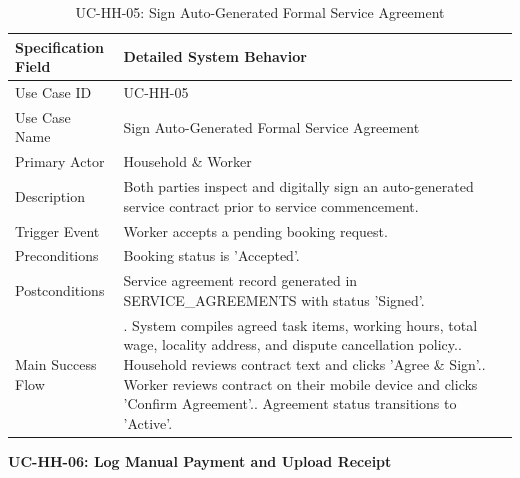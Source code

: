 \documentclass[12pt,a4paper]{article}
\begin{document}
\begin{longtable}{|>{\raggedright\arraybackslash}p{\dimexpr(\linewidth-4\tabcolsep-3\arrayrulewidth)/2\relax}|>{\raggedright\arraybackslash}p{\dimexpr(\linewidth-4\tabcolsep-3\arrayrulewidth)/2\relax}|}
\caption{UC-HH-05: Sign Auto-Generated Formal Service Agreement}\label{tab:uc-hh-05}\\
\hline
Specification Field & Detailed System Behavior \\ \hline
Use Case ID & UC-HH-05 \\ \hline
Use Case Name & Sign Auto-Generated Formal Service Agreement \\ \hline
Primary Actor & Household \& Worker \\ \hline
Description & Both parties inspect and digitally sign an auto-generated service contract prior to service commencement. \\ \hline
Trigger Event & Worker accepts a pending booking request. \\ \hline
Preconditions & Booking status is 'Accepted'. \\ \hline
Postconditions & Service agreement record generated in SERVICE\_\allowbreak{}AGREEMENTS with status 'Signed'. \\ \hline
Main Success Flow & 1. System compiles agreed task items, working hours, total wage, locality address, and dispute cancellation policy.\newline 2. Household reviews contract text and clicks 'Agree \& Sign'.\newline 3. Worker reviews contract on their mobile device and clicks 'Confirm Agreement'.\newline 4. Agreement status transitions to 'Active'. \\ \hline
\end{longtable}
\endgroup
\clearpage
\noindent\textbf{UC-HH-06: Log Manual Payment and Upload Receipt}\par
\vspace{4pt}
\begingroup\small\setlength{\tabcolsep}{3pt}\renewcommand{\arraystretch}{1.15}
\end{document}
